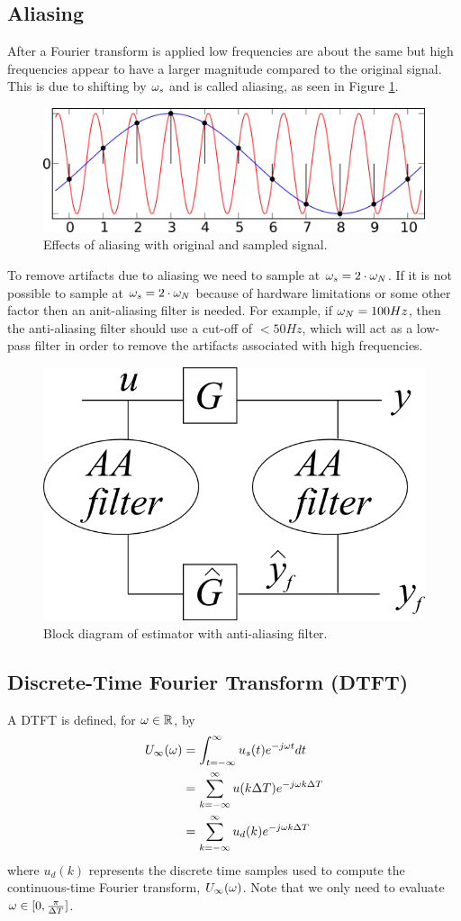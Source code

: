 \subsection{Aliasing}
After a Fourier transform is applied low frequencies are about the same but high frequencies appear to have a larger magnitude compared to the original signal. This is due to shifting by $\omega_s$ and is called aliasing, as seen in Figure \ref{fig:02aliasingSines}.
\begin{figure}[ht!]
	\centering
	\includegraphics[width=.5\textwidth]{images/02aliasingSines}
	\caption{Effects of aliasing with original and sampled signal.}
	\label{fig:02aliasingSines}
\end{figure}

To remove artifacts due to aliasing we need to sample at $\omega_s = 2\cdot\omega_N$. If it is not possible to sample at $\omega_s = 2\cdot\omega_N$ because of hardware limitations or some other factor then an anit-aliasing filter is needed. For example, if $\omega_N = 100 Hz$, then the anti-aliasing filter should use a cut-off of $< 50 Hz$, which will act as a low-pass filter in order to remove the artifacts associated with high frequencies.
\begin{figure}[ht!]
	\centering
	\includegraphics[width=.25\textwidth]{images/02aafilter}
	\caption{Block diagram of estimator with anti-aliasing filter.}
	\label{fig:02aafilter}
\end{figure}

\subsection{Discrete-Time Fourier Transform (DTFT)}
A DTFT is defined, for $\omega\in\mathbb{R}$, by
\begin{align*}
U_\infty(\omega) &= \int_{t=-\infty}^\infty u_s(t)e^{-j\omega t} dt \\
&= \sum_{k=-\infty}^\infty u(k\Delta T) e^{-j\omega k\Delta T} \\
&= \sum_{k=-\infty}^\infty u_d(k) e^{-j\omega k\Delta T}
\end{align*}
where $u_d(k)$ represents the discrete time samples used to compute the continuous-time Fourier transform, $U_\infty(\omega)$. Note that we only need to evaluate $\omega\in[0, \frac{\pi}{\Delta T}]$.


